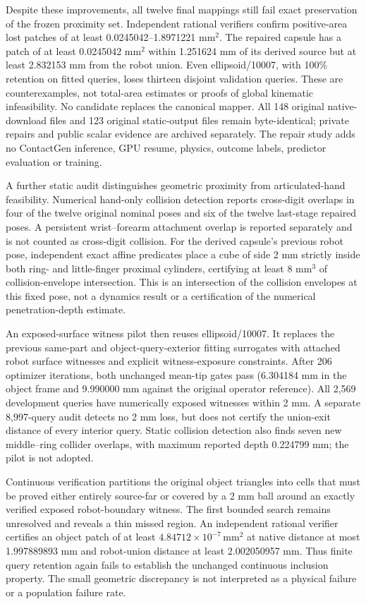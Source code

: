 \documentclass[10pt,letterpaper]{article}
\begin{document}
Despite these improvements, all twelve final mappings still fail exact
preservation of the frozen proximity set. Independent rational verifiers
confirm positive-area lost patches of at least 0.0245042--1.8971221
$\mathrm{mm}^2$. The repaired capsule has a patch of at least 0.0245042
$\mathrm{mm}^2$ within 1.251624 mm of its derived source but at least
2.832153 mm from the robot union. Even ellipsoid/10007, with 100\% retention
on fitted queries, loses thirteen disjoint validation queries. These are
counterexamples, not total-area estimates or proofs of global kinematic
infeasibility. No candidate replaces the canonical mapper. All 148 original
native-download files and 123 original static-output files remain byte-identical;
private repairs and public scalar evidence are archived separately. The repair
study adds no ContactGen inference, GPU resume, physics, outcome labels,
predictor evaluation or training.

A further static audit distinguishes geometric proximity from articulated-hand
feasibility. Numerical hand-only collision detection reports cross-digit
overlaps in four of the twelve original nominal poses and six of the twelve
last-stage repaired poses. A persistent wrist--forearm attachment overlap is
reported separately and is not counted as cross-digit collision. For the
derived capsule's previous robot pose, independent exact affine predicates
place a cube of side 2 mm strictly inside both ring- and little-finger proximal
cylinders, certifying at least 8 $\mathrm{mm}^3$ of collision-envelope
intersection. This is an intersection of the collision envelopes at this fixed pose,
not a dynamics result or a certification of the numerical penetration-depth
estimate.

An exposed-surface witness pilot then reuses ellipsoid/10007. It replaces the
previous same-part and object-query-exterior fitting surrogates with attached
robot surface witnesses and explicit witness-exposure constraints. After 206
optimizer iterations, both unchanged mean-tip gates pass (6.304184 mm in the
object frame and 9.990000 mm against the original operator reference). All
2,569 development queries have numerically exposed witnesses within 2 mm.
A separate 8,997-query audit detects no 2 mm loss, but does not certify the
union-exit distance of every interior query. Static collision detection also
finds seven new middle--ring collider overlaps, with maximum reported depth
0.224799 mm; the pilot is not adopted.

Continuous verification partitions the original object triangles into cells
that must be proved either entirely source-far or covered by a 2 mm ball around
an exactly verified exposed robot-boundary witness. The first bounded search
remains unresolved and reveals a thin missed region. An independent rational
verifier certifies an object patch of at least
$4.84712\times10^{-7}\,\mathrm{mm}^2$ at native distance at most
1.997889893 mm and robot-union distance at least 2.002050957 mm. Thus finite
query retention again fails to establish the unchanged continuous inclusion
property. The small geometric discrepancy is not interpreted as a physical
failure or a population failure rate.
\end{document}
